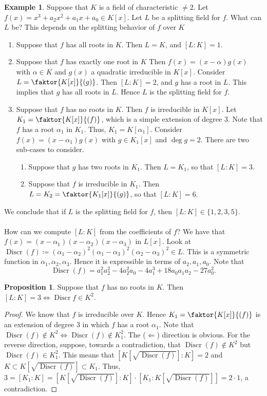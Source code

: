 \documentclass[10pt,letterpaper,cm]{nupset}
\theoremstyle{definition}
\newtheorem{exmp}{Example}
\newtheorem{prop}{Proposition}
\newcommand{\1}{\mathbf{1}}
\newcommand{\0}{\vec 0}
\DeclareMathOperator{\disc}{Discr}
\begin{document}
\begin{exmp} 
Suppose that $K$ is a field of characteristic $\ne 2$. Let $f(x) = x^3 + a_2x^2 + a_1x + a_0 \in K[x]$. Let $L$ be a splitting field for $f$. What can $L$ be? This depends on the splitting behavior of $f$ over $K$
\begin{enumerate}
\item Suppose that $f$ has all roots in $K$. Then $L = K$, and $[L:K]=1$.
\item Suppose that $f$ has exactly one root in $K$ Then $f(x) = (x-\alpha)g(x)$ with $\alpha \in K$ and $g(x)$ a quadratic irreducible in $K[x]$. Consider $L = \faktor{K[x]}{(g)}$. Then $[L: K]=2$, and $g$ has a root in $L$. This implies that $g$ has all roots in $L$. Hence $L$ is the splitting field for $f$. 
\item Suppose that $f$ has no roots in $K$. Then $f$ is irreducible in $K[x]$. Let $K_1 = \faktor{K[x]}{(f)}$, which is a simple extension of degree $3$. Note that $f$ has a root $\alpha_1$ in $K_1$. Thus, $K_1 = K[\alpha_1]$. Consider $f(x) = (x -\alpha_1)g(x)$ with $g \in K_1[x]$ and $\deg{g} =2$. There are two sub-cases to consider.
\begin{enumerate}
\item Suppose that $g$ has two roots in $K_1$. Then $L= K_1$, so that $[L:K] =3$.
\item Suppose that $f$ is irreducible in $K_1$. Then $L= K_2 = \faktor{K_1[x]}{(g)}$, so that $[L:K] =6$.
\end{enumerate}
\end{enumerate}
We conclude that if $L$ is the splitting field for $f$, then $[L:K] \in \{1, 2, 3, 5\}$.
\\ \\
How can we compute $[L:K]$ from the coefficients of $f$?
We have that $f(x) = (x- \alpha_1)(x-\alpha_2)(x-\alpha_3)$ in $L[x]$. Look at $\disc(f)\coloneqq  (\alpha_1 - \alpha_2)^2(\alpha_1 - \alpha_3)^2(\alpha_2 - \alpha_3)^2 \in L$. This is a symmetric function in $\alpha_1, \alpha_2, \alpha_3$. Hence it is expressible in terms of $a_2, a_1, a_0$. Note that $$\disc(f) = a_1^2a_2^2 -4a_2^2a_0 -4a_1^3 + 18 a_0a_1a_2 - 27a_0^2.$$
\begin{prop}
Suppose that $f$ has no roots in $K$. Then $[L:K] = 3 \iff \disc{f} \in K^2$.
\end{prop}
\begin{proof}
We know that $f$ is irreducible over $K$. Hence $K_1 = \faktor{K[x]}{(f)}$ is an extension of degree $3$ in which $f$ has a root $\alpha_1$. Note that $\disc(f) \notin K^2 \iff \disc(f) \notin K_1^2$. The ($\Longleftarrow$) direction is obvious. For the reverse direction, suppose, towards a contradiction, that $\disc(f) \notin K^2$ but $\disc(f) \in K_1^2$. This means that $[K[\sqrt{\disc(f)}] :K] = 2$ and $K\subset K[\sqrt{\disc(f)}] \subset K_1$. Thus, $3 = [K_1 : K] = [K[\sqrt{\disc(f)}] : K] \cdot [K_1 : K[\sqrt{\disc(f)}]] = 2 \cdot 1$, a contradiction. 

\end{proof}
\end{exmp}
\end{document}
